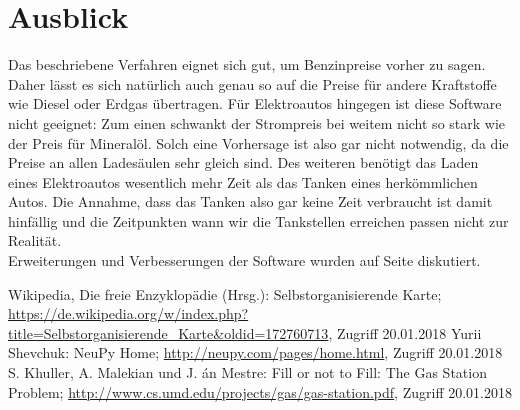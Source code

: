 \documentclass[11pt]{article}
\begin{document}
\section{Ausblick}
	Das beschriebene Verfahren eignet sich gut, um Benzinpreise vorher zu sagen. Daher lässt es sich natürlich auch genau so auf die Preise für andere Kraftstoffe wie Diesel oder Erdgas übertragen. Für Elektroautos hingegen ist diese Software nicht geeignet: Zum einen schwankt der Strompreis bei weitem nicht so stark wie der Preis für Mineralöl. Solch eine Vorhersage ist also gar nicht notwendig, da die Preise an allen Ladesäulen sehr gleich sind. Des weiteren benötigt das Laden eines Elektroautos wesentlich mehr Zeit als das Tanken eines herkömmlichen Autos. Die Annahme, dass das Tanken also gar keine Zeit verbraucht ist damit hinfällig und die Zeitpunkten wann wir die Tankstellen erreichen passen nicht zur Realität.\\
	Erweiterungen und Verbesserungen der Software wurden auf Seite \pageref{potential} diskutiert.
	
	
	\begin{thebibliography}{999}
		 Wikipedia, Die freie Enzyklopädie (Hrsg.): Selbstorganisierende Karte; \url{https://de.wikipedia.org/w/index.php?title=Selbstorganisierende_Karte&oldid=172760713}, Zugriff 20.01.2018
		 Yurii Shevchuk: NeuPy Home; \url{http://neupy.com/pages/home.html}, Zugriff 20.01.2018
		 S. Khuller, A. Malekian und J. án Mestre: Fill or not to Fill: The Gas Station Problem; \url{http://www.cs.umd.edu/projects/gas/gas-station.pdf},  Zugriff 20.01.2018
	\end{thebibliography}
	
\end{document}
